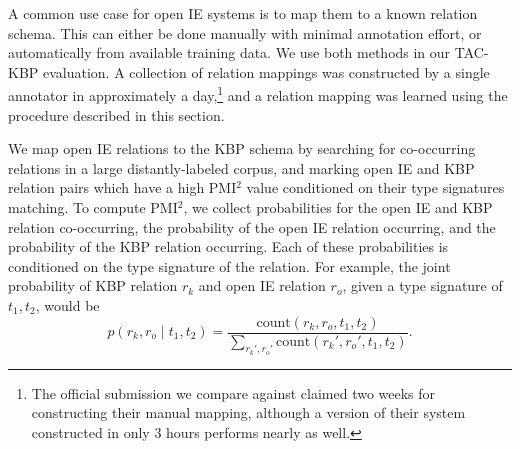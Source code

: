 A common use case for open IE systems is to map them to a
  known relation schema.
This can either be done manually with minimal annotation effort, or
  automatically from available training data.
We use both methods in our TAC-KBP evaluation.
A collection of relation mappings was constructed by a single
  annotator in approximately a day,\footnote{
    The official submission we compare against claimed two weeks for constructing
    their manual mapping, although a version of their system constructed in only
    3 hours performs nearly as well.
  } and a relation mapping was learned
  using the procedure described in this section.
%

We map open IE relations to the KBP schema by searching for co-occurring
  relations in a large distantly-labeled corpus, and marking open IE and
  KBP relation pairs which have a high PMI$^2$ value
  \cite{key:1994dailee-pmisquared,key:2005evert-pmi}
  conditioned on their
  type signatures matching.
To compute PMI$^2$, we collect probabilities for the open IE and KBP
  relation co-occurring, the probability of the open IE relation occurring,
  and the probability of the KBP relation occurring.
Each of these probabilities is conditioned on the type signature of the relation.
For example, the joint probability of KBP relation $r_k$ and open IE relation
  $r_o$, given a type signature of $t_1, t_2$, would be
\begin{equation*}
  p(r_k, r_o \mid t_1, t_2) = \frac{
    \textrm{count}(r_k, r_o,  t_1, t_2)
  }{
    \sum_{r_k', r_o'}\textrm{count}(r_k', r_o', t_1, t_2)
  }.
\end{equation*}

